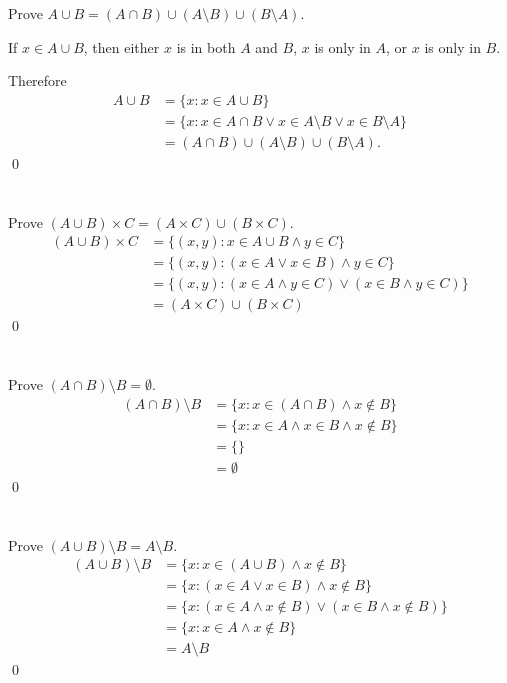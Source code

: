 Prove $A \cup B = (A \cap B) \cup (A \setminus B) \cup (B \setminus A)$.
\hr

If $x \in A \cup B$, then either $x$ is in both $A$ and $B$, $x$ is only in $A$, or $x$ is only in $B$.

\medskip

Therefore
\begin{align*}
    A \cup B &= \{x : x \in A \cup B\} \\
    &= \{x : x \in A \cap B \lor x \in A \setminus B \lor x \in B \setminus A\} \\
    &= (A \cap B) \cup (A \setminus B) \cup (B \setminus A).
\end{align*}\qed

\section{}\label{sec:11}

Prove $(A \cup B) \times C = (A \times C) \cup (B \times C)$.
\hr
\begin{align*}
    (A \cup B) \times C &= \{(x, y) : x \in A \cup B \land y \in C\} \\
    &= \{(x, y) : (x \in A \lor x \in B) \land y \in C\} \\
    &= \{(x, y) : (x \in A \land y \in C) \lor (x \in B \land y \in C)\} \\
    &= (A \times C) \cup (B \times C)
\end{align*}\qed

\section{}\label{sec:12}

Prove $(A \cap B) \setminus B = \emptyset$.
\hr
\begin{align*}
    (A \cap B) \setminus B &= \{x : x \in (A \cap B) \land x \notin B\} \\
    &= \{x : x \in A \land x \in B \land x \notin B\} \\
    &= \{\} \\
    &= \emptyset
\end{align*}\qed

\section{}\label{sec:13}

Prove $(A \cup B) \setminus B = A \setminus B$.
\hr
\begin{align*}
    (A \cup B) \setminus B &= \{x : x \in (A \cup B) \land x \notin B\} \\
    &= \{x : (x \in A \lor x \in B) \land x \notin B\} \\
    &= \{x : (x \in A \land x \notin B) \lor (x \in B \land x \notin B)\} \\
    &= \{x : x \in A \land x \notin B\} \\
    &= A \setminus B
\end{align*}\qed
\pagebreak
